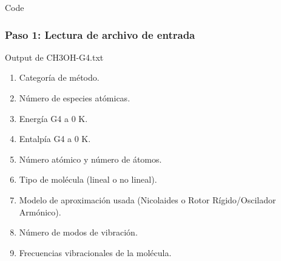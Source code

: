 \documentclass{beamer}
\begin{document}
\begin{frame}[fragile]{Code}
\frametitle{Paso 1: Lectura de archivo de entrada}

\begin{block}{Output de CH3OH-G4.txt}
\begin{enumerate}		
	\item Categoría de método. 
	\item Número de especies atómicas.
	\item Energía G4 a 0 K.
	\item Entalpía G4 a 0 K.
	\item Número atómico y número de átomos.
	\item Tipo de molécula (lineal o no lineal).
	\item Modelo de aproximación usada (Nicolaides o Rotor Rígido/Oscilador Armónico).
	\item Número de modos de vibración.
	\item Frecuencias vibracionales de la molécula.
\end{enumerate}
\end{block}
\end{frame}

\end{document}
